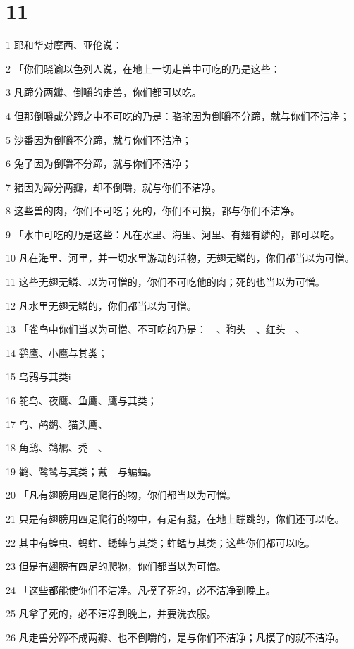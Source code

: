 \chapter{11}

\par 1 耶和华对摩西、亚伦说：
\par 2 「你们晓谕以色列人说，在地上一切走兽中可吃的乃是这些：
\par 3 凡蹄分两瓣、倒嚼的走兽，你们都可以吃。
\par 4 但那倒嚼或分蹄之中不可吃的乃是：骆驼因为倒嚼不分蹄，就与你们不洁净；
\par 5 沙番因为倒嚼不分蹄，就与你们不洁净；
\par 6 兔子因为倒嚼不分蹄，就与你们不洁净；
\par 7 猪因为蹄分两瓣，却不倒嚼，就与你们不洁净。
\par 8 这些兽的肉，你们不可吃；死的，你们不可摸，都与你们不洁净。
\par 9 「水中可吃的乃是这些：凡在水里、海里、河里、有翅有鳞的，都可以吃。
\par 10 凡在海里、河里，并一切水里游动的活物，无翅无鳞的，你们都当以为可憎。
\par 11 这些无翅无鳞、以为可憎的，你们不可吃他的肉；死的也当以为可憎。
\par 12 凡水里无翅无鳞的，你们都当以为可憎。
\par 13 「雀鸟中你们当以为可憎、不可吃的乃是：　、狗头　、红头　、
\par 14 鹞鹰、小鹰与其类；
\par 15 乌鸦与其类i
\par 16 鸵鸟、夜鹰、鱼鹰、鹰与其类；
\par 17 鸟、鸬鹚、猫头鹰、
\par 18 角鸱、鹈鹕、秃　、
\par 19 鹳、鹭鸶与其类；戴　与蝙蝠。
\par 20 「凡有翅膀用四足爬行的物，你们都当以为可憎。
\par 21 只是有翅膀用四足爬行的物中，有足有腿，在地上蹦跳的，你们还可以吃。
\par 22 其中有蝗虫、蚂蚱、蟋蟀与其类；蚱蜢与其类；这些你们都可以吃。
\par 23 但是有翅膀有四足的爬物，你们都当以为可憎。
\par 24 「这些都能使你们不洁净。凡摸了死的，必不洁净到晚上。
\par 25 凡拿了死的，必不洁净到晚上，并要洗衣服。
\par 26 凡走兽分蹄不成两瓣、也不倒嚼的，是与你们不洁净；凡摸了的就不洁净。

